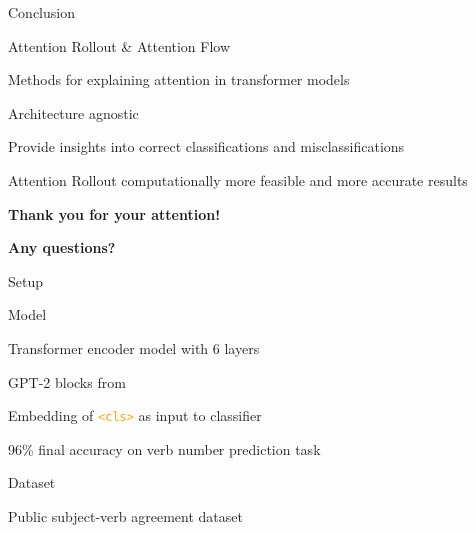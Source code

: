 \documentclass[xcolor=table]{beamer} %
\begin{document}
\begin{frame}{Conclusion}
    \begin{block}{\large Attention Rollout \& Attention Flow}
        \pause
        \begin{itemize}
            \setlength{\itemsep}{0.5em}
            {\large
            \item Methods for explaining attention in transformer models \pause
            \item Architecture agnostic \pause
            \item Provide insights into correct classifications and misclassifications \pause
            \item Attention Rollout computationally more feasible and more accurate results
            }
        \end{itemize}
    \end{block}
\end{frame}

\begin{frame}

    \centering

    \LARGE \textbf{Thank you for your attention!}


    \large \textbf{Any questions?}

\end{frame}



\begin{frame}
    \printbibliography
\end{frame}

\begin{frame}{Setup}
    \begin{block}{\large Model}
        \begin{itemize}
            {\large
            \item Transformer encoder model with 6 layers
            \item GPT-2 blocks from~\cite{Radford2019LanguageMA}
            \item Embedding of \texttt{\textcolor{orange}{<cls>}} as input to classifier
            \item 96\% final accuracy on verb number prediction task
            }
        \end{itemize}
    \end{block}

    \vspace{1em}

    \begin{block}{\large Dataset}
        \begin{itemize}
            {\large
            \item Public subject-verb agreement dataset~\cite{linzen2016assessingabilitylstmslearn}
            }
        \end{itemize}
    \end{block}
\end{frame}
\end{document}

